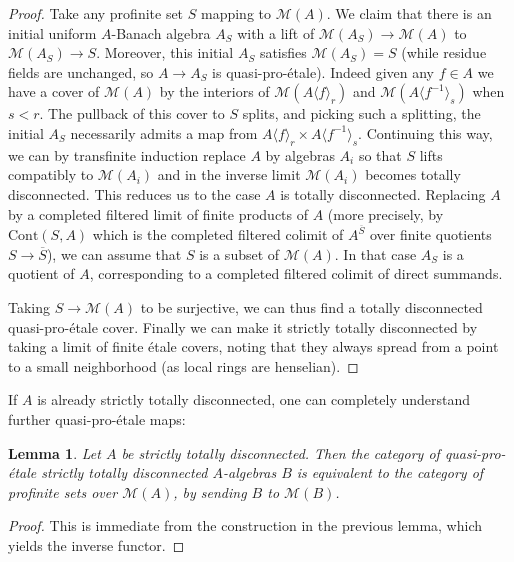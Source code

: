 \documentclass[11pt]{amsart}
\numberwithin{equation}{section}
\numberwithin{theorem}{section}
\newtheorem{lemma}[theorem]{Lemma}
\theoremstyle{definition}
\begin{document}
\begin{proof} Take any profinite set $S$ mapping to $\mathcal M(A)$. We claim that there is an initial uniform $A$-Banach algebra $A_S$ with a lift of $\mathcal M(A_S)\to \mathcal M(A)$ to $\mathcal M(A_S)\to S$. Moreover, this initial $A_S$ satisfies $\mathcal M(A_S)=S$ (while residue fields are unchanged, so $A\to A_S$ is quasi-pro-\'etale). Indeed given any $f\in A$ we have a cover of $\mathcal M(A)$ by the interiors of $\mathcal M(A\langle f\rangle_r)$ and $\mathcal M(A\langle f^{-1}\rangle_s)$ when $s<r$. The pullback of this cover to $S$ splits, and picking such a splitting, the initial $A_S$ necessarily admits a map from $A\langle f\rangle_r\times A\langle f^{-1}\rangle_s$. Continuing this way, we can by transfinite induction replace $A$ by algebras $A_i$ so that $S$ lifts compatibly to $\mathcal M(A_i)$ and in the inverse limit $\mathcal M(A_i)$ becomes totally disconnected. This reduces us to the case $A$ is totally disconnected. Replacing $A$ by a completed filtered limit of finite products of $A$ (more precisely, by $\mathrm{Cont}(S,A)$ which is the completed filtered colimit of $A^{\overline{S}}$ over finite quotients $S\to \overline{S}$), we can assume that $S$ is a subset of $\mathcal M(A)$. In that case $A_S$ is a quotient of $A$, corresponding to a completed filtered colimit of direct summands.

Taking $S\to \mathcal M(A)$ to be surjective, we can thus find a totally disconnected quasi-pro-\'etale cover. Finally we can make it strictly totally disconnected by taking a limit of finite \'etale covers, noting that they always spread from a point to a small neighborhood (as local rings are henselian).
\end{proof}

If $A$ is already strictly totally disconnected, one can completely understand further quasi-pro-\'etale maps:

\begin{lemma}\label{lem:quasiproetaleoverstd} Let $A$ be strictly totally disconnected. Then the category of quasi-pro-\'etale strictly totally disconnected $A$-algebras $B$ is equivalent to the category of profinite sets over $\mathcal M(A)$, by sending $B$ to $\mathcal M(B)$.
\end{lemma}

\begin{proof} This is immediate from the construction in the previous lemma, which yields the inverse functor.
\end{proof}
\end{document}
